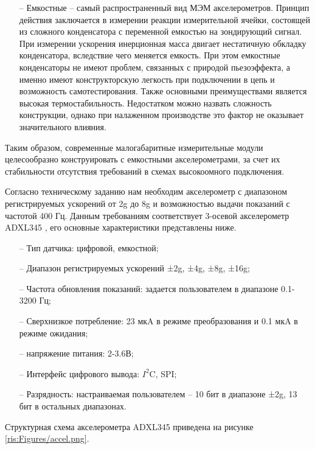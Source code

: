 \begin{sloppypar}
\begin{itemize}
	\item[--]Емкостные – самый распространенный вид МЭМ акселерометров. Принцип действия заключается в измерении реакции измерительной ячейки, состоящей из сложного конденсатора с переменной емкостью на зондирующий сигнал. При измерении ускорения инерционная масса двигает нестатичную обкладку конденсатора, вследствие чего меняется емкость. При этом емкостные конденсаторы не имеют проблем, связанных с природой пьезоэффекта, а именно имеют конструкторскую легкость при подключении в цепь и возможность самотестирования. Также основными преимуществами является высокая термостабильность. Недостатком можно назвать сложность конструкции, однако при налаженном производстве это фактор не оказывает значительного влияния.

\end{itemize}

Таким образом, современные малогабаритные измерительные модули целесообразно конструировать с емкостными акселерометрами, за счет их стабильности отсутствия требований в схемах высокоомного подключения.


Согласно техническому заданию нам необходим акселерометр с диапазоном регистрируемых ускорений от 2g до 8g и возможностью выдачи показаний с частотой 400 Гц. Данным требованиям соответствует 3-осевой акселерометр ADXL345 \cite {ADXL}, его основные характеристики представлены ниже.


\begin{onehalfspace}
\begin{itemize}
	\item[--] Тип датчика: цифровой, емкостной;
	\item[--]Диапазон регистрируемых ускорений ±2g, ±4g, ±8g, ±16g;
	\item[--]Частота обновления показаний: задается пользователем в диапазоне 0.1-3200 Гц;
	\item[--]Сверхнизкое потребление:  23 мкA в режиме преобразования и 0.1 мкA в режиме ожидания;
	\item[--] напряжение питания: 2-3.6В;
	\item[--] Интерфейс цифрового вывода: $I^2$C, SPI; 
	\item[--] Разрядность: настраиваемая пользователем -- 10 бит в диапазоне ±2g, 13 бит в остальных диапазонах.	
\end{itemize}
\end{onehalfspace}




Структурная схема акселерометра ADXL345 приведена на рисунке \ref{ris:Figures/accel.png}.


\end{sloppypar}
